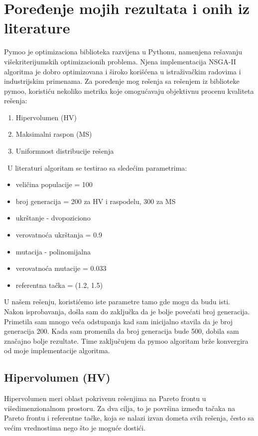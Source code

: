 \documentclass[12pt]{article}
\begin{document}
\section{Poređenje mojih rezultata i onih iz literature}
Pymoo je optimizaciona biblioteka razvijena u Pythonu, namenjena rešavanju višekriterijumskih optimizacionih problema. Njena implementacija NSGA-II algoritma je dobro optimizovana i široko korišćena u istraživačkim radovima i industrijskim primenama.
Za poređenje mog rešenja sa rešenjem iz biblioteke pymoo, koristiću nekoliko metrika koje omogućavaju objektivnu procenu kvaliteta rešenja:
\begin{enumerate} 
	\item {Hipervolumen (HV)} 
	\item {Maksimalni raspon (MS)}  
	\item {Uniformnost distribucije rešenja} 
\end{enumerate}
\
U literaturi \cite{gete-plots} algoritam se testirao sa sledećim parametrima:
\begin{itemize}
\item veličina populacije = 100
\item broj generacija = 200 za HV i raspodelu, 300 za MS
\item ukrštanje - dvopoziciono
\item verovatnoća ukrštanja = 0.9
\item mutacija - polinomijalna
\item verovatnoća mutacije = 0.033
\item referentna tačka = (1.2, 1.5)
\end{itemize}
U našem rešenju, koristićemo iste parametre tamo gde mogu da budu isti.
\\
Nakon isprobavanja, došla sam do zaključka da je bolje povećati broj generacija. Primetila sam mnogo veća odstupanja kad sam inicijalno stavila da je broj generacija 200. Kada sam promenila da broj generacija bude 500, dobila sam značajno bolje rezultate. Time zaključujem da pymoo algoritam brže konvergira od moje implementacije algoritma.

\subsection{Hipervolumen (HV)}
Hipervolumen meri oblast pokrivenu rešenjima na Pareto frontu u višedimenzionalnom prostoru. Za dva cilja, to je površina između tačaka na Pareto frontu i referentne tačke, koja se nalazi izvan dometa svih rešenja, često sa većim vrednostima nego što je moguće dostići.
   
\end{document}
